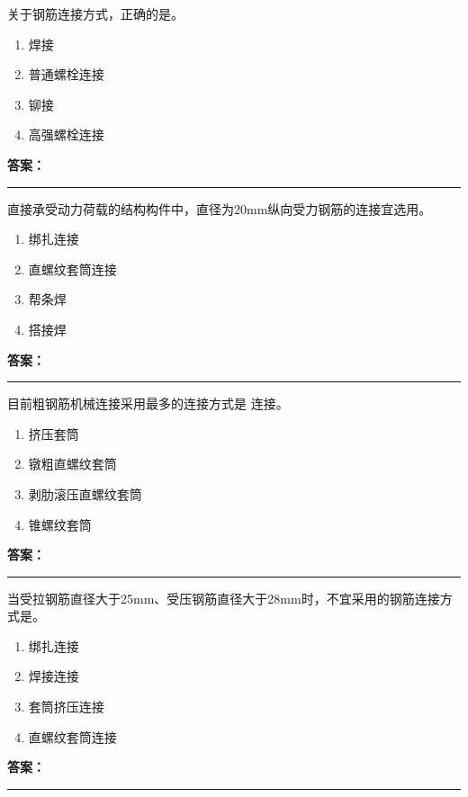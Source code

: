 \documentclass[UTF8,fontset=fandol,11pt]{ctexart}
\newcommand{\answerline}{\textcolor{answerred}{\rule{2.4cm}{0.7pt}}}
\begin{document}
\begin{quizbox}[title={第 17 题}]
关于钢筋连接方式，正确的是。\\
\begin{enumerate}[label=\Alph*.]
\item 焊接
\item 普通螺栓连接
\item 铆接
\item 高强螺栓连接
\end{enumerate}
\textbf{\textcolor{answerred}{答案：}} \answerline
\end{quizbox}

\begin{quizbox}[title={第 18 题}]
直接承受动力荷载的结构构件中，直径为20mm纵向受力钢筋的连接宜选用。\\
\begin{enumerate}[label=\Alph*.]
\item 绑扎连接
\item 直螺纹套筒连接
\item 帮条焊
\item 搭接焊
\end{enumerate}
\textbf{\textcolor{answerred}{答案：}} \answerline
\end{quizbox}

\begin{quizbox}[title={第 19 题}]
目前粗钢筋机械连接采用最多的连接方式是 连接。\\
\begin{enumerate}[label=\Alph*.]
\item 挤压套筒
\item 镦粗直螺纹套筒
\item 剥肋滚压直螺纹套筒
\item 锥螺纹套筒
\end{enumerate}
\textbf{\textcolor{answerred}{答案：}} \answerline
\end{quizbox}

\begin{quizbox}[title={第 20 题}]
当受拉钢筋直径大于25mm、受压钢筋直径大于28mm时，不宜采用的钢筋连接方式是。\\
\begin{enumerate}[label=\Alph*.]
\item 绑扎连接
\item 焊接连接
\item 套筒挤压连接
\item 直螺纹套筒连接
\end{enumerate}
\textbf{\textcolor{answerred}{答案：}} \answerline
\end{quizbox}
\end{document}
